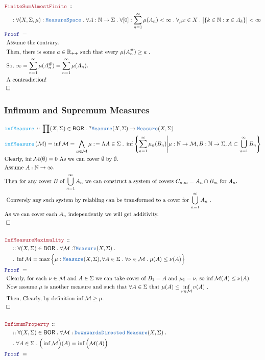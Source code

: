 \documentclass[12pt]{scrartcl}
\newcommand{\TYPE}[1]{\textcolor{NavyBlue}{\mathtt{#1}}}
\newcommand{\FUNC}[1]{\textcolor{Cerulean}{\mathtt{#1}}}
\newcommand{\LOGIC}[1]{\textcolor{Blue}{\mathtt{#1}}}
\newcommand{\THM}[1]{\textcolor{Maroon}{\mathtt{#1}}}
\renewcommand{\.}{\; . \;}
\newcommand{\de}{: \kern 0.1pc =}
\newcommand{\Act}[1]{\left( #1 \right)}
\newcommand{\Theorem}[2]{& \THM{#1} \, :: \, #2 \\ & \Proof = \\ }
\newcommand{\DeclareFunc}[2]{& \FUNC{#1} \, :: \, #2 \\}
\newcommand{\DefineNamedFunc}[4]{&  \FUNC{#1}\Act{#2} = #3 \de #4 \\}
\newcommand{\NewLine}{\\ & \kern 1pc}
\newcommand{\Page}[1]{ \begin{align*} #1 \end{align*}   }
\newcommand{\Reals}{\mathbb{R} }
\newcommand{\Nat}{\mathbb{N} }
\newcommand{\QED}{\; \square}
\newcommand{\EndProof}{& \QED \\}
\newcommand{\Proof}{\LOGIC{Proof} \; }
\newcommand{\Explain}[1]{& \text{#1.} \\}
\newcommand{\Exclaim}[1]{& \text{#1!} \\}
\newcommand{\BOR}{\mathsf{BOR}}
\newcommand{\Measure}{\TYPE{Measure}}
\newcommand{\MS}{\TYPE{MeasureSpace}}
\begin{document}
\Page{
	\Theorem{FiniteSumAlmostFinite}
	{
			\NewLine :			
			\forall (X,\Sigma,\mu) : \MS \.
			\forall A : \Nat \to \Sigma \.
			\forall [0] : \sum^\infty_{n=1} \mu(A_n) < \infty \.
			\forall_\mu x \in X \.  
			\big| \{ k \in \Nat : x \in A_k  \} \big| < \infty
	}
	\Explain{ 
		Assume the contrary}
	\Explain{
		Then, there is some $a \in \Reals_{++}$
		such that every $\mu(A^\#_n) \ge a$	}
	\Explain{
		So,  $\infty = \sum^\infty_{n=1} \mu(A^\#_{n}) =  \sum^\infty_{n=1} \mu(A_n)$}
	\Exclaim{
		A contradiction}
	\EndProof
}
\newpage
\subsubsection{Infimum and Supremum Measures}
\Page{
	\DeclareFunc{infMeasure}{\prod (X,\Sigma) \in \BOR \. 
		?\Measure(X,\Sigma) \to \Measure(X,\Sigma)
	}
	\DefineNamedFunc{infMeasure}{\mathcal{M}}{\inf{\mathcal{M}} = 
		\bigwedge_{\mu \in \mathcal{M}} \mu}
	{
		\Lambda A \in \Sigma \.
		\inf\left\{
			\sum^\infty_{n=1} \mu_n(B_n) \Bigg| 
			\mu : \Nat \to \mathcal{M}, B : \Nat \to \Sigma,
			A \subset \bigcup^\infty_{n=1} B_n
		\right\}
	}
	\Explain{Clearly, $\inf {\mathcal{M}}(\emptyset) =0$ As we can cover $\emptyset$ by $\emptyset$}
	\Explain{Assume $A : \Nat \to \infty$}
	\Explain{Then for any cover $B$ of $\bigcup^\infty_{n=1} A_n$
		we can construct a system of covers $C_{n,m} = A_n \cap B_m$ for $A_n$}
	\Explain{ Conversly any such system by relabling can be transformed to a cover for 
		$\bigcup^\infty_{n=1} A_n$  }
	\Explain{As we can cover each $A_n$ independently we will get additivity}
	\EndProof
	\\
	\Theorem{InfMeasureMaximality}
	{
		\NewLine ::		
		\forall (X,\Sigma) \in \BOR \.
		\forall \mathcal{M} : ?\Measure(X,\Sigma) \. \NewLine \.
		\inf {\mathcal{M}} = 
		\max \Big\{ 
			\mu : \Measure(X,\Sigma), 
			\forall A \in \Sigma \. 
			\forall \nu \in \mathcal{M}  \.
			\mu(A) \le \nu(A)
		\Big\}
	}
	\Explain{ Clearly, for each $\nu \in \mathcal{M}$ and $A \in \Sigma$ 
		we can take cover of $B_1=A$ and $\mu_1=\nu$, so
		$\inf {\mathcal{M}}(A) \le \nu(A)$}
	\Explain{ Now assume 
		$\mu$ is another measure and such that $\forall A \in \Sigma$ 
		that $\mu(A)  \le  \inf_{\nu \in \mathcal{M }} \nu(A)$ 
	}
	\Explain{ Then, Clearly, by definition $\inf \mathcal{M} \ge \mu$}
	\EndProof
	\\
	\Theorem{InfimumProperty}
	{
		\NewLine ::
		\forall (X,\Sigma) \in \BOR \.
		\forall \mathcal{M} : \TYPE{DownwardsDirected}\;\Measure(X,\Sigma) \. \NewLine \.
		\forall A \in \Sigma \.
		\Big( \inf \mathcal{M}\Big)(A) = \inf \Big(\mathcal{M}(A)\Big) 
}}
\end{document}
